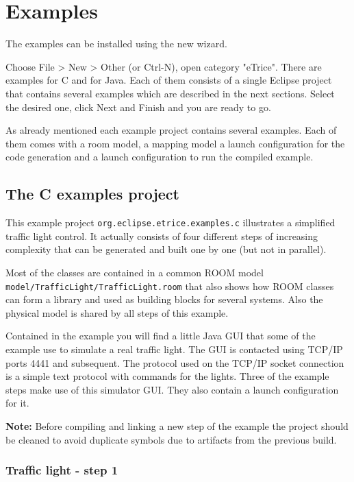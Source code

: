 \chapter{Examples}

The \eTrice examples can be installed using the new wizard.

Choose File > New > Other (or Ctrl-N), open category "eTrice".
There are examples for C and for Java. Each of them consists of a single
Eclipse project that contains several examples which are described
in the next sections.
Select the desired one, click Next and Finish and you are ready to go.

As already mentioned each example project contains several examples.
Each of them comes with a room model, a mapping model a launch configuration
for the code generation and a launch configuration to run the compiled example.

\section{The C examples project}

This example project \texttt{org.eclipse.etrice.examples.c} illustrates
a simplified traffic light control.
It actually consists of four different steps of increasing
complexity that can be generated and
built one by one (but not in parallel).

Most of the classes are contained in a common ROOM model
\texttt{model/TrafficLight/TrafficLight.room} that also shows
how ROOM classes can form a library and used as building blocks for several systems.
Also the physical model is shared by all steps of this example.

Contained in the example you will find a little Java GUI that some of the
example use to simulate a real traffic light. The GUI is contacted
using TCP/IP ports 4441 and subsequent. The protocol used on the TCP/IP
socket connection is a simple text protocol with commands for the lights.
Three of the example steps make use of this simulator GUI. They
also contain a launch configuration for it.

\textbf{Note:} Before compiling and linking a new step of the example
the project should be cleaned to avoid duplicate symbols due to
artifacts from the previous build.

\subsection{Traffic light - step 1}

